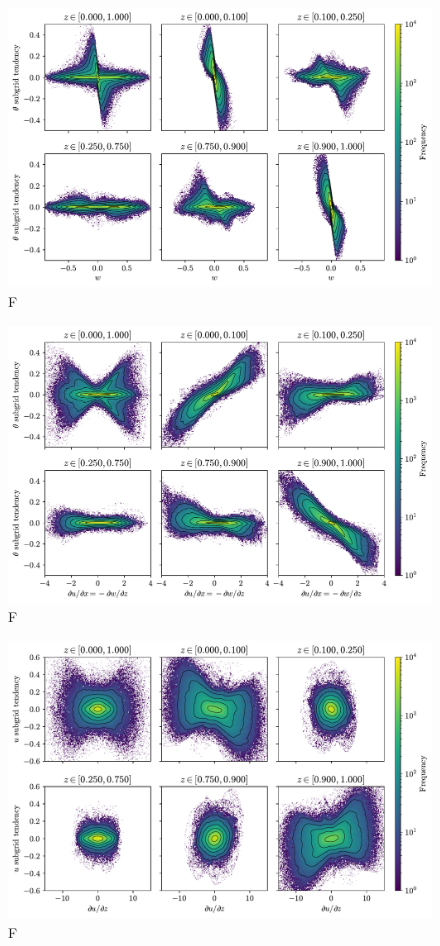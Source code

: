 \documentclass[../main.tex]{subfiles}
\begin{document}
\begin{figure}[ht]
    \centering
    \includegraphics[width=\linewidth]{figures/theta_vs_w.pdf}
    \caption{
        F
    }
    \label{fig:theta_vs_w}
\end{figure}

\begin{figure}[ht]
    \centering
    \includegraphics[width=\linewidth]{figures/theta_vs_dudx.pdf}
    \caption{
        F
    }
    \label{fig:theta_vs_dudx}
\end{figure}

\begin{figure}[ht]
    \centering
    \includegraphics[width=\linewidth]{figures/u_vs_dudz.pdf}
    \caption{
        F
    }
    \label{fig:u_vs_dudz}
\end{figure}
\end{document}
